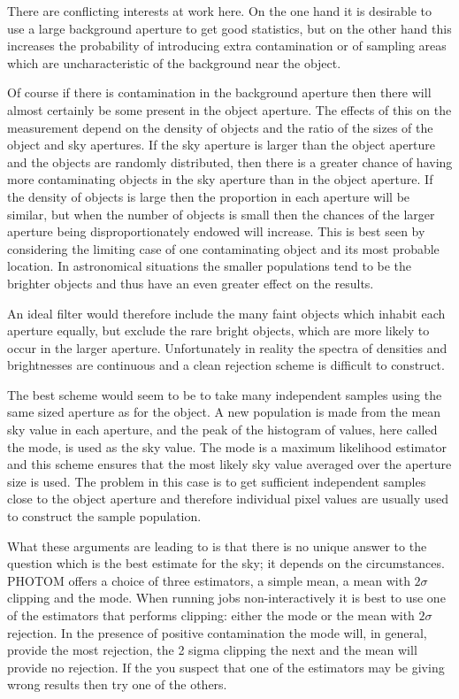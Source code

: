 \documentclass[twoside,11pt]{article}
\renewcommand{\_}{\texttt{\symbol{95}}}
\begin{document}
There are conflicting interests at work here. On the one hand it is
desirable to use a large background aperture to get good statistics, but
on the other hand this increases the probability of introducing extra
contamination or of sampling areas which are uncharacteristic of the
background near the object.

Of course if there is contamination in the background aperture then there
will almost certainly be some present in the object aperture. The effects
of this on the measurement depend on the density of objects and the ratio
of the sizes of the object and sky apertures. If the sky aperture is
larger than the object aperture and the objects are randomly distributed,
then there is a greater chance of having more contaminating objects in the
sky aperture than in the object aperture.
If the density of objects is large then the proportion in each aperture will
be similar, but when the number of objects is small then the chances of
the larger aperture being disproportionately endowed will increase. This
is best seen by considering the limiting case of one contaminating object
and its most probable location. In astronomical situations the smaller
populations tend to be the brighter objects and thus have an even greater
effect on the results.

An ideal filter would therefore include the many faint objects which
inhabit each aperture equally, but exclude the rare bright objects, which
are more likely to occur in the larger aperture. Unfortunately in reality
the spectra of densities and brightnesses are continuous and a clean
rejection scheme is difficult to construct.

The best scheme would seem to be to take many independent samples
using the same sized aperture as for the object. A new population is made
from the mean sky value in each aperture, and the peak of the histogram of
values, here called the mode, is used as the sky value. The mode is a
maximum likelihood estimator and this scheme ensures that the most likely
sky value averaged over the aperture size is used.
The problem in this case
is to get sufficient independent samples close to the object aperture and
therefore individual pixel values are usually used to construct the
sample population.

What these arguments are leading to is that there is no unique answer to
the question which is the best estimate for the sky; it depends on the
circumstances.
PHOTOM offers a choice of three estimators, a simple mean, a mean with
$2\sigma$ clipping and the mode.
When running jobs non-interactively it is best to use one of the estimators
that performs clipping: either the mode or the mean with $2\sigma$ rejection.
In the presence of positive contamination the mode will, in general,
provide the most rejection, the 2 sigma clipping the next and the mean
will provide no rejection. If the you suspect that one of the
estimators may be giving wrong results then try one of the
others.
\end{document}
